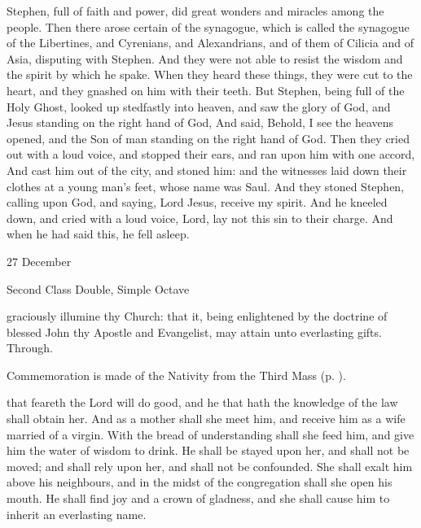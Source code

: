  Stephen, full of faith and power, did great wonders and miracles among the people. Then there arose certain of the synagogue, which is called the synagogue of the Libertines, and Cyrenians, and Alexandrians, and of them of Cilicia and of Asia, disputing with Stephen. And they were not able to resist the wisdom and the spirit by which he spake. When they heard these things, they were cut to the heart, and they gnashed on him with their teeth. But Stephen, being full of the Holy Ghost, looked up stedfastly into heaven, and saw the glory of God, and Jesus standing on the right hand of God, And said, Behold, I see the heavens opened, and the Son of man standing on the right hand of God. Then they cried out with a loud voice, and stopped their ears, and ran upon him with one accord, And cast him out of the city, and stoned him: and the witnesses laid down their clothes at a young man's feet, whose name was Saul. And they stoned Stephen, calling upon God, and saying, Lord Jesus, receive my spirit. And he kneeled down, and cried with a loud voice, Lord, lay not this sin to their charge. And when he had said this, he fell asleep.

\begin{inhead}
{27 December}\par
{Second Class Double, Simple Octave}
\end{inhead}

\collect
 graciously illumine thy Church: that it, being enlightened by the doctrine of blessed John thy Apostle and Evangelist, may attain unto everlasting gifts. Through.
\begin{rubric}
    Commemoration is made of the Nativity from the Third Mass (p. \pageref{NativityMassIII}).
\end{rubric}

 that feareth the Lord will do good, and he that hath the knowledge of the law shall obtain her. And as a mother shall she meet him, and receive him as a wife married of a virgin. With the bread of understanding shall she feed him, and give him the water of wisdom to drink. He shall be stayed upon her, and shall not be moved; and shall rely upon her, and shall not be confounded. She shall exalt him above his neighbours, and in the midst of the congregation shall she open his mouth. He shall find joy and a crown of gladness, and she shall cause him to inherit an everlasting name.

